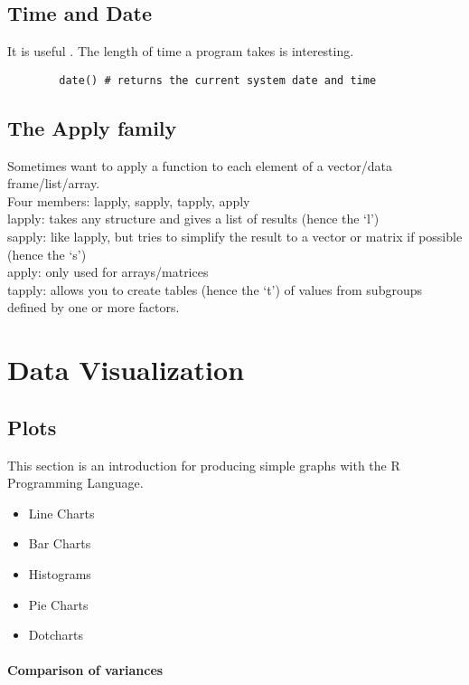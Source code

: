 \documentclass[a4paper,12pt]{article}
\begin{document}
	
	\section{Time and Date}
	It is useful . The length of time a program takes is interesting.
	
	
	\begin{framed}
		\begin{verbatim}
		date() # returns the current system date and time
		\end{verbatim}
	\end{framed}
	
	
	\section{The Apply family}
	
	Sometimes want to apply a function to each element of a
	vector/data frame/list/array.
	\\
	Four members: lapply, sapply, tapply, apply
	\\
	lapply: takes any structure and gives a list of results (hence
	the `l')
	\\
	sapply: like lapply, but tries to simplify the result to a
	vector or matrix if possible (hence the `s')
	\\
	apply: only used for arrays/matrices
	\\
	tapply: allows you to create tables (hence the `t') of values
	from subgroups defined by one or more factors.
	\newpage
	\chapter{Data Visualization}
	\section{Plots}
	This section is an introduction for producing simple graphs with
	the R Programming Language.
	\begin{itemize}
		\item Line Charts  \item Bar Charts \item Histograms \item Pie
		Charts \item Dotcharts
	\end{itemize}
	
	\subsubsection{Comparison of variances}
	
\end{document}

